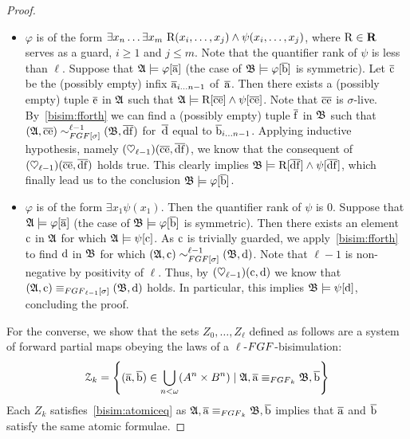 \begin{proof}
\begin{itemize}
  \item $\varphi$ is of the form $\exists{x_{n}} \ldots \exists{x_{m}}\ \mathrm{R}(x_{i}, \ldots, x_{j}) \land \psi(x_{i}, \ldots, x_{j})$, where $\mathrm{R} \in \mathbf{R}$ serves as a guard, $i \geq 1$ and $j \leq m$.
  Note that the quantifier rank of $\psi$ is less than $\ell$.
  Suppose that ${\mathfrak{A}} \models \varphi[\overline{\mathrm{a}}]$ (the case of ${\mathfrak{B}} \models \varphi[\overline{\mathrm{b}}]$ is symmetric).
  Let $\overline{\mathrm{c}}$ be the (possibly empty) infix $\overline{\mathrm{a}}_{i\ldots n{-}1}$ of~$\overline{\mathrm{a}}$.
  Then there exists a (possibly empty) tuple $\overline{\mathrm{e}}$ in ${\mathfrak{A}}$ such that ${\mathfrak{A}} \models \mathrm{R}[\overline{\mathrm{c}}\overline{\mathrm{e}}] \land \psi[\overline{\mathrm{c}}\overline{\mathrm{e}}]$.
  Note that $\overline{\mathrm{c}}\overline{\mathrm{e}}$ is $\sigma$-live. 
  By~\ref{bisim:fforth} we can find a (possibly empty) tuple $\overline{\mathrm{f}}$ in ${\mathfrak{B}}$ such that $(\str{A}, \elemtuplec\elemtuplee) \bisimto_{\FGF[\sigma]}^{\ell{-}1} (\str{B}, \elemtupled\elemtuplef)$ for~$\overline{\mathrm{d}}$ equal to $\overline{\mathrm{b}}_{i\ldots n{-}1}$.
  Applying inductive hypothesis, namely $(\heartsuit_{\ell{-}1})(\overline{\mathrm{c}}\overline{\mathrm{e}},\overline{\mathrm{d}}\overline{\mathrm{f}})$, we know that the consequent of $(\heartsuit_{\ell{-}1})(\overline{\mathrm{c}}\overline{\mathrm{e}},\overline{\mathrm{d}}\overline{\mathrm{f}})$ holds true.
  This clearly implies ${\mathfrak{B}} \models \mathrm{R}[\overline{\mathrm{d}}\overline{\mathrm{f}}] \land \psi[\overline{\mathrm{d}}\overline{\mathrm{f}}]$, which finally lead us to the conclusion ${\mathfrak{B}} \models \varphi[\overline{\mathrm{b}}]$.

  \item $\varphi$ is of the form $\exists{x_{1}} \psi(x_1)$. Then the quantifier rank of $\psi$ is $0$.
  Suppose that ${\mathfrak{A}} \models \varphi[\overline{\mathrm{a}}]$ (the case of ${\mathfrak{B}} \models \varphi[\overline{\mathrm{b}}]$ is symmetric).
  Then there exists an element $\mathrm{c}$ in ${\mathfrak{A}}$ for which ${\mathfrak{A}} \models \psi[\mathrm{c}]$.
  As $\mathrm{c}$ is trivially guarded, we apply~\ref{bisim:fforth} to find $\mathrm{d}$ in ${\mathfrak{B}}$ for which $(\str{A}, \elem{c}) \bisimto_{\FGF[\sigma]}^{\ell{-}1} (\str{B}, \elem{d})$.
  Note that $\ell{-}1$ is non-negative by positivity of $\ell$. 
  Thus, by $(\heartsuit_{\ell{-}1})(\mathrm{c},\mathrm{d})$ we know that $(\str{A}, \elem{c}) \equiv_{\FGF_{\ell{-}1}[\sigma]} (\str{B}, \elem{d})$ holds. 
  In particular, this implies ${\mathfrak{B}} \models \psi[\mathrm{d}]$, concluding the proof.
\end{itemize}

  For the converse, we show that the sets $Z_{0}, \ldots, Z_{\ell}$ defined as follows are a system of forward partial maps obeying the laws of a $\ell$-$\FGF$-bisimulation:
  \begin{equation*}
  \mathcal{Z}_{k} = \left\{ (\elemtuplea, \elemtupleb) \in \bigcup_{n < \omega} (A^{n} \times B^{n}) \mid \str{A}, \elemtuplea \equiv_{\FGF_{k}} \str{B},\elemtupleb \right\}
  \end{equation*}
  Each $Z_{k}$ satisfies~\ref{bisim:atomiceq} as $\str{A}, \elemtuplea \equiv_{\FGF_{k}} \str{B},\elemtupleb$ implies that $\overline{\mathrm{a}}$ and $\overline{\mathrm{b}}$ satisfy the same atomic formulae.


\end{proof}
